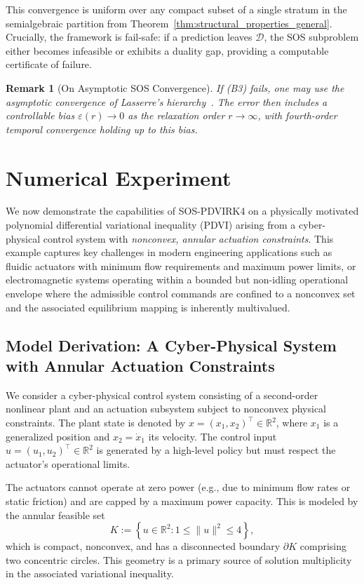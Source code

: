 \documentclass[sn-basic,Numbered]{sn-jnl}
\theoremstyle{thmstyleone}%
\newtheorem{remark}{Remark}%
\begin{document}
This convergence is uniform over any compact subset of a single stratum in the semialgebraic partition from Theorem~\ref{thm:structural_properties_general}. Crucially, the framework is fail-safe: if a prediction leaves $\mathcal{D}$, the SOS subproblem either becomes infeasible or exhibits a duality gap, providing a computable certificate of failure.

\begin{remark}[On Asymptotic SOS Convergence]
If (B3) fails, one may use the asymptotic convergence of Lasserre’s hierarchy~\cite{Lasserre2001}. The error then includes a controllable bias $\varepsilon(r) \to 0$ as the relaxation order $r \to \infty$, with fourth-order temporal convergence holding up to this bias.
\end{remark}

\section{Numerical Experiment}
\label{sec:numerics}

We now demonstrate the capabilities of SOS-PDVIRK4 on a physically motivated polynomial differential variational inequality (PDVI) arising from a cyber-physical control system with \emph{nonconvex, annular actuation constraints}. This example captures key challenges in modern engineering applications such as fluidic actuators with minimum flow requirements and maximum power limits, or electromagnetic systems operating within a bounded but non-idling operational envelope where the admissible control commands are confined to a nonconvex set and the associated equilibrium mapping is inherently multivalued.

\subsection{Model Derivation: A Cyber-Physical System with Annular Actuation Constraints}
\label{subsec:model_derivation}

We consider a cyber-physical control system consisting of a second-order nonlinear plant and an actuation subsystem subject to nonconvex physical constraints. The plant state is denoted by $x = (x_1, x_2)^\top \in \mathbb{R}^2$, where $x_1$ is a generalized position and $x_2 = \dot{x}_1$ its velocity. The control input $u = (u_1, u_2)^\top \in \mathbb{R}^2$ is generated by a high-level policy but must respect the actuator's operational limits.

The actuators cannot operate at zero power (e.g., due to minimum flow rates or static friction) and are capped by a maximum power capacity. This is modeled by the annular feasible set
\[
K := \left\{ u \in \mathbb{R}^2 : 1 \leq \|u\|^2 \leq 4 \right\},
\]
which is compact, nonconvex, and has a disconnected boundary $\partial K$ comprising two concentric circles. This geometry is a primary source of solution multiplicity in the associated variational inequality.
\end{document}
